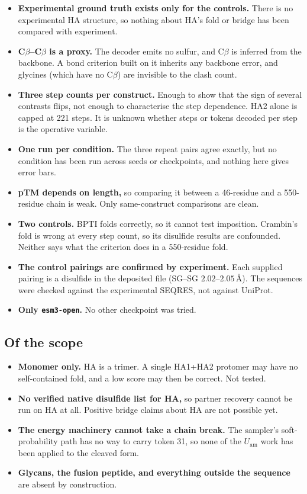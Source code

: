 \documentclass[11pt,a4paper]{article}
\newcommand{\ang}{\,\mbox{\AA}}
\begin{document}
\begin{itemize}
\item \textbf{Experimental ground truth exists only for the controls.} There is
  no experimental HA structure, so nothing about HA's fold or bridge has been
  compared with experiment.
\item \textbf{C$\beta$--C$\beta$ is a proxy.} The decoder emits no sulfur, and
  C$\beta$ is inferred from the backbone. A bond criterion built on it
  inherits any backbone error, and glycines (which have no C$\beta$) are
  invisible to the clash count.
\item \textbf{Three step counts per construct.} Enough to show that the sign
  of several contrasts flips, not enough to characterise the step
  dependence. HA2 alone is capped at 221 steps. It is unknown whether steps or
  tokens decoded per step is the operative variable.
\item \textbf{One run per condition.} The three repeat pairs agree exactly, but
  no condition has been run across seeds or checkpoints, and nothing here
  gives error bars.
\item \textbf{pTM depends on length,} so comparing it between a 46-residue
  and a 550-residue chain is weak. Only same-construct comparisons are
  clean.
\item \textbf{Two controls.} BPTI folds correctly, so it cannot test imposition.
  Crambin's fold is wrong at every step count, so its disulfide results are
  confounded. Neither says what the criterion does in a 550-residue fold.
\item \textbf{The control pairings are confirmed by experiment.} Each supplied
  pairing is a disulfide in the deposited file (SG--SG $2.02$--$2.05\ang$). The
  sequences were checked against the experimental SEQRES, not against UniProt.
\item \textbf{Only \texttt{esm3-open}.} No other checkpoint was tried.
\end{itemize}

\subsection{Of the scope}

\begin{itemize}
\item \textbf{Monomer only.} HA is a trimer. A single HA1+HA2 protomer may
  have no self-contained fold, and a low score may then be correct. Not
  tested.
\item \textbf{No verified native disulfide list for HA,} so partner recovery
  cannot be run on HA at all. Positive bridge claims about HA are not
  possible yet.
\item \textbf{The energy machinery cannot take a chain break.} The sampler's
  soft-probability path has no way to carry token 31, so none of the
  \(U_{\mathrm{am}}\) work has been applied to the cleaved form.
\item \textbf{Glycans, the fusion peptide, and everything outside the
  sequence} are absent by construction.
\end{itemize}
\end{document}
